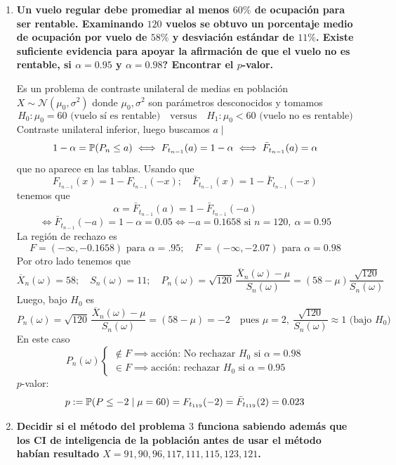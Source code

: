 \begin{enumerate}
  \item \textbf{Un vuelo regular debe promediar al menos $60\%$ de ocupación para ser rentable. Examinando $120$ vuelos se obtuvo un porcentaje medio de ocupación por vuelo de $58\%$ y desviación estándar de $11\%$. Existe suficiente evidencia para apoyar la afirmación de que el vuelo no es rentable, si $\alpha = 0.95$ y $\alpha = 0.98$? Encontrar el $p$-valor.}

  Es un problema de contraste unilateral de medias en población $X \sim \mathcal N(\mu_0, \sigma^2)$ donde $\mu_0, \sigma^2$ son parámetros desconocidos y tomamos
  \[
    H_0 : \mu_0 = 60 \text{ (vuelo sí es rentable)} \quad \text{versus} \quad H_1 : \mu_0 < 60 \text{ (vuelo no es rentable)}
  \]
  Contraste unilateral inferior, luego buscamos $a \mid$
  \[
    1 - \alpha = \mathbb{P}(P_n \leq a) \iff F_{t_{n-1}}(a) = 1 - \alpha \iff \bar{F}_{t_{n-1}}(a) = \alpha
  \]
  que no aparece en las tablas. Usando que
  \[
    F_{t_{n-1}}(x) = 1 - F_{t_{n-1}}(-x); \quad \bar{F}_{t_{n-1}}(x) = 1 - \bar{F}_{t_{n-1}}(-x)
  \]
  tenemos que
  \[
    \alpha = \bar{F}_{t_{n-1}}(a) = 1 - \bar{F}_{t_{n-1}}(-a) \] \[ \iff \bar{F}_{t_{n-1}}(-a) = 1 - \alpha = 0.05 \iff -a = 0.1658 \text{ si } n = 120,\ \alpha = 0.95
  \]
  La región de rechazo es
  \[
    F = (-\infty, -0.1658) \text{ para } \alpha = .95; \quad F = (-\infty, -2.07) \text{ para } \alpha = 0.98
  \]
  Por otro lado tenemos que
  \[
    \overline{X}_n(\omega) = 58; \quad S_n(\omega) = 11; \quad P_n(\omega) = \sqrt{120}\,\frac{\overline{X}_n(\omega) - \mu}{S_n(\omega)} = (58 - \mu)\frac{\sqrt{120}}{S_n(\omega)}
  \]
  Luego, bajo $H_0$ es
  \[
    P_n(\omega) = \sqrt{120}\,\frac{\overline{X}_n(\omega) - \mu}{S_n(\omega)} = (58 - \mu) = -2 \quad \text{pues } \mu = 2,\ \frac{\sqrt{120}}{S_n(\omega)} \approx 1 \text{ (bajo } H_0\text{)}
  \]
  En este caso
  \[
    P_n(\omega)
    \begin{cases}
      \notin F \implies \text{acción: No rechazar } H_0 \text{ si } \alpha = 0.98 \\
      \in F \implies \text{acción: rechazar } H_0 \text{ si } \alpha = 0.95
    \end{cases}
  \]
  $p$-valor:
  \[
    p := \mathbb{P}(P \leq -2 \mid \mu = 60) = F_{t_{119}}(-2) = \bar{F}_{t_{119}}(2) = 0.023
  \]

  \item \textbf{Decidir si el método del problema $3$ funciona sabiendo además que los CI de inteligencia de la población antes de usar el método habían resultado $X = 91, 90, 96, 117, 111, 115, 123, 121$.}


\end{enumerate}
